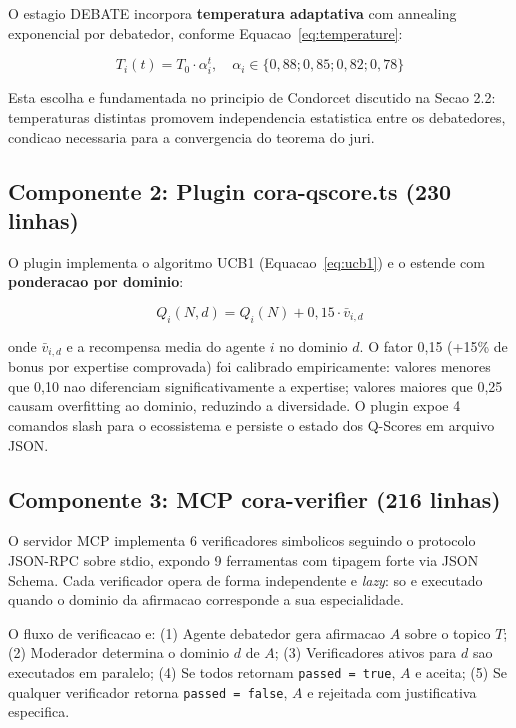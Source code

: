 \documentclass[5p]{elsarticle}
\begin{document}
O estagio DEBATE incorpora \textbf{temperatura adaptativa} com annealing exponencial por debatedor, conforme Equacao~\ref{eq:temperature}:

\begin{equation}\label{eq:temperature}
  T_i(t) = T_0 \cdot \alpha_i^t, \quad \alpha_i \in \{0,88; 0,85; 0,82; 0,78\}
\end{equation}

Esta escolha e fundamentada no principio de Condorcet discutido na Secao 2.2: temperaturas distintas promovem independencia estatistica entre os debatedores, condicao necessaria para a convergencia do teorema do juri.

\subsection{Componente 2: Plugin cora-qscore.ts (230 linhas)}

O plugin implementa o algoritmo UCB1 (Equacao~\ref{eq:ucb1}) e o estende com \textbf{ponderacao por dominio}:

\begin{equation}\label{eq:domain-ucb}
  Q_i(N, d) = Q_i(N) + 0,15 \cdot \bar{v}_{i,d}
\end{equation}

onde $\bar{v}_{i,d}$ e a recompensa media do agente $i$ no dominio $d$. O fator 0,15 (+15\% de bonus por expertise comprovada) foi calibrado empiricamente: valores menores que 0,10 nao diferenciam significativamente a expertise; valores maiores que 0,25 causam overfitting ao dominio, reduzindo a diversidade. O plugin expoe 4 comandos slash para o ecossistema e persiste o estado dos Q-Scores em arquivo JSON.

\subsection{Componente 3: MCP cora-verifier (216 linhas)}

O servidor MCP implementa 6 verificadores simbolicos seguindo o protocolo JSON-RPC sobre stdio, expondo 9 ferramentas com tipagem forte via JSON Schema. Cada verificador opera de forma independente e \textit{lazy}: so e executado quando o dominio da afirmacao corresponde a sua especialidade.

O fluxo de verificacao e: (1) Agente debatedor gera afirmacao $A$ sobre o topico $T$; (2) Moderador determina o dominio $d$ de $A$; (3) Verificadores ativos para $d$ sao executados em paralelo; (4) Se todos retornam \texttt{passed = true}, $A$ e aceita; (5) Se qualquer verificador retorna \texttt{passed = false}, $A$ e rejeitada com justificativa especifica.
\end{document}
